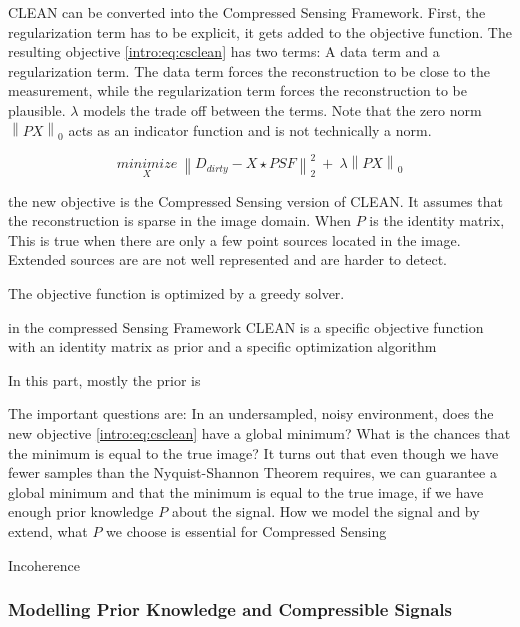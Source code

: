 CLEAN can be converted into the Compressed Sensing Framework. First, the regularization term has to be explicit, it gets added to the objective function. The resulting objective \eqref{intro:eq:csclean} has two terms: A data term and a regularization term. The data term forces the reconstruction to be close to the measurement, while the regularization term forces the reconstruction to be plausible. $\lambda$ models the trade off between the terms. Note that the zero norm $\left \| PX \right \|_0$ acts as an indicator function and is not technically a norm.

\begin{equation}\label{intro:eq:csclean}
\underset{X}{minimize} \: \left \| D_{dirty} -X \star PSF \right \|_2^2 \: + \: \lambda \left \| PX \right \|_0
\end{equation}

 the new objective is the Compressed Sensing version of CLEAN. It assumes that the reconstruction is sparse in the image domain. When $P$ is the identity matrix, This is true when there are only a few point sources located in the image. Extended sources are are not well represented and are harder to detect. 
 
 The objective function is optimized by a greedy solver. 

in the compressed Sensing Framework CLEAN is
a specific objective function
with an identity matrix as prior
and a specific optimization algorithm

In this part, mostly the prior is 

The important questions are: In an undersampled, noisy environment, does the new objective \eqref{intro:eq:csclean} have a global minimum? What is the chances that the minimum is equal to the true image? It turns out that even though we have fewer samples than the Nyquist-Shannon Theorem requires, we can guarantee a global minimum and that the minimum is equal to the true image, if we have enough prior knowledge $P$ about the signal. How we model the signal and by extend, what $P$ we choose is essential for Compressed Sensing

Incoherence

\subsubsection{Modelling Prior Knowledge and Compressible Signals}


